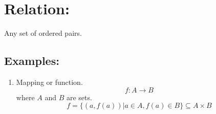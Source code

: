 \documentclass[12pt]{article}
\title{\scalebox{2.5}{Math 431 Class Notes}}
\author{\scalebox{1.5}{Theo Koss}}
\date{September 2022}
\begin{document}
\maketitle
\section{Relation:}
Any set of ordered pairs.
\subsection{Examples:}
\begin{enumerate}
    \item Mapping or function. $$f:A\to B$$ where $A$ and $B$ are sets. $$f=\{(a,f(a))|a\in A, f(a)\in B\}\subseteq A\times B$$
\end{enumerate}
\end{document}
